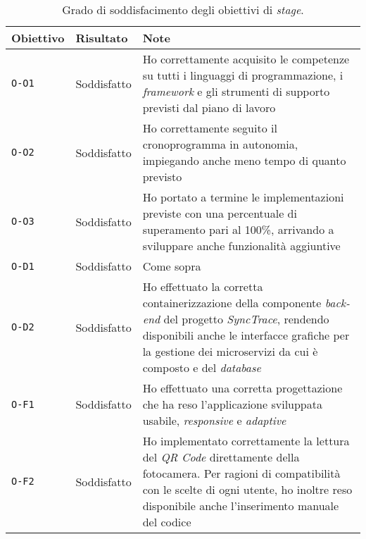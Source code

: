 \begin{table}[h]
  \begin{center}
\begin{tabular}{llp{8cm}}
\textbf{Obiettivo}         & \textbf{Risultato}               & \textbf{Note}            \\ \hline
\multicolumn{1}{|l|}{\texttt{O-O1}} & \multicolumn{1}{l|}{Soddisfatto} & \multicolumn{1}{p{8cm}|}{Ho correttamente acquisito le competenze su tutti i linguaggi di programmazione, i \textit{framework} e gli strumenti di supporto previsti dal piano di lavoro} \\ \hline
\multicolumn{1}{|l|}{\texttt{O-O2}} & \multicolumn{1}{l|}{Soddisfatto} & \multicolumn{1}{p{8cm}|}{Ho correttamente seguito il cronoprogramma in autonomia, impiegando anche meno tempo di quanto previsto} \\ \hline
\multicolumn{1}{|l|}{\texttt{O-O3}} & \multicolumn{1}{l|}{Soddisfatto} & \multicolumn{1}{p{8cm}|}{Ho portato a termine le implementazioni previste con una percentuale di superamento pari al 100\%, arrivando a sviluppare anche funzionalità aggiuntive} \\ \hline
\multicolumn{1}{|l|}{\texttt{O-D1}} & \multicolumn{1}{l|}{Soddisfatto} & \multicolumn{1}{p{8cm}|}{Come sopra} \\ \hline
\multicolumn{1}{|l|}{\texttt{O-D2}} & \multicolumn{1}{l|}{Soddisfatto} & \multicolumn{1}{p{8cm}|}{Ho effettuato la corretta containerizzazione della componente \textit{back-end} del progetto \textit{SyncTrace}, rendendo disponibili anche le interfacce grafiche per la gestione dei microservizi da cui è composto e del \textit{database}} \\ \hline
\multicolumn{1}{|l|}{\texttt{O-F1}} & \multicolumn{1}{l|}{Soddisfatto} & \multicolumn{1}{p{8cm}|}{Ho effettuato una corretta progettazione che ha reso l'applicazione sviluppata usabile, \textit{responsive} e \textit{adaptive}} \\ \hline
\multicolumn{1}{|l|}{\texttt{O-F2}} & \multicolumn{1}{l|}{Soddisfatto} & \multicolumn{1}{p{8cm}|}{Ho implementato correttamente la lettura del \textit{QR Code} direttamente della fotocamera. Per ragioni di compatibilità con le scelte di ogni utente, ho inoltre reso disponibile anche l'inserimento manuale del codice} \\ \hline
\end{tabular}
\end{center}
\caption{Grado di soddisfacimento degli obiettivi di \textit{stage}.}
\end{table}

